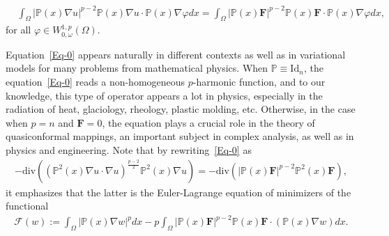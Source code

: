 \documentclass[a4paper, 11pt]{article}
\begin{document}
\begin{align}\label{var-P0}
& \int_{\Omega} |\mathbb{P}(x)\nabla u|^{p-2}\mathbb{P}(x)\nabla u \cdot  \mathbb{P}(x)\nabla\varphi dx  =  \int_{\Omega} |\mathbb{P}(x)\mathbf{F}|^{p-2}\mathbb{P}(x)\mathbf{F} \cdot \mathbb{P}(x)\nabla \varphi dx,
\end{align}
for all $\varphi \in W^{1,p}_{0,\omega}(\Omega)$.

Equation~\eqref{Eq-0} appears naturally in different contexts as well as in variational models for many problems from mathematical physics. When $\mathbb{P}\equiv\mathrm{Id}_n$, the equation~\eqref{Eq-0} reads a non-homogeneous $p$-harmonic function, and to our knowledge, this type of operator appears a lot in physics, especially in the radiation of heat, glaciology, rheology, plastic molding, etc. Otherwise, in the case when $p=n$ and $\mathbf{F}=0$, the equation plays a crucial role in the theory of quasiconformal mappings, an important subject in complex analysis, as well as in physics and engineering. Note that by rewriting~\eqref{Eq-0} as
\begin{align*}
-\mathrm{div}\left((\mathbb{P}^2(x) \nabla u \cdot \nabla u)^{\frac{p-2}{2}}\mathbb{P}^2(x) \nabla u \right) = -\mathrm{div} \left( |\mathbb{P}(x)\mathbf{F}|^{p-2}\mathbb{P}^2(x)\mathbf{F}\right),
\end{align*}
it emphasizes that the latter is the Euler-Lagrange equation of minimizers of the functional
\begin{align*}
\mathcal{F}(w):=\int_\Omega{|\mathbb{P}(x) \nabla w|^p dx} - p \int_\Omega{|\mathbb{P}(x) \mathbf{F}|^{p-2}\mathbb{P}(x)\mathbf{F} \cdot (\mathbb{P}(x) \nabla w)dx}.
\end{align*}
\end{document}
